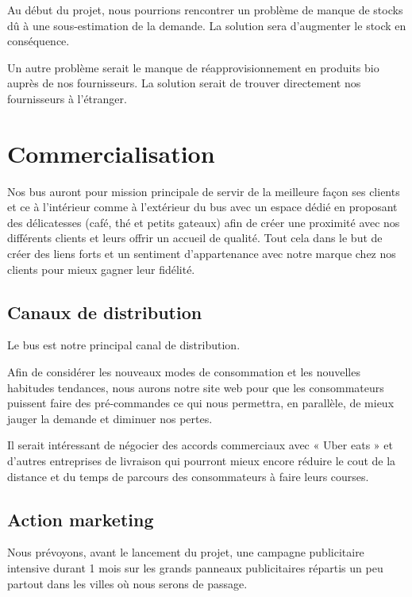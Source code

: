 \documentclass[12pt,a4paper]{report}
\begin{document}
				
				Au début du projet, nous pourrions rencontrer un problème de manque de stocks dû à une sous-estimation de la demande. La solution sera d'augmenter le stock en conséquence.
				
				Un autre problème serait le manque de réapprovisionnement en produits bio auprès de nos fournisseurs. La solution serait de trouver directement nos fournisseurs à l'étranger.
				

				
				
				
		\chapter{Commercialisation}
		
					Nos bus auront pour mission principale de servir de la meilleure façon ses clients et ce à l'intérieur comme à l'extérieur du bus avec un espace dédié en proposant des délicatesses (café, thé et petits gateaux) afin de créer une proximité avec nos différents clients et leurs offrir un accueil de qualité. Tout cela dans le but de créer des liens forts et un sentiment d’appartenance avec notre marque chez nos clients pour mieux gagner leur fidélité. 
		
			\section{Canaux de distribution}
			
				Le bus est notre principal canal de distribution.
	
				Afin de considérer les nouveaux modes de consommation et les nouvelles habitudes tendances, nous aurons notre site web pour que les consommateurs puissent faire des pré-commandes ce qui nous permettra, en parallèle, de mieux jauger la demande et diminuer nos pertes.
	
				Il serait intéressant de négocier des accords commerciaux avec « Uber eats » et d'autres entreprises de livraison qui pourront mieux encore réduire le cout de la distance et du temps de parcours des consommateurs à faire leurs courses.
				
				
			\section{Action marketing}
				
				Nous prévoyons, avant le lancement du projet,  une campagne publicitaire intensive durant 1 mois sur les grands panneaux publicitaires répartis un peu partout dans les villes où nous serons de passage. 
				
\end{document}

